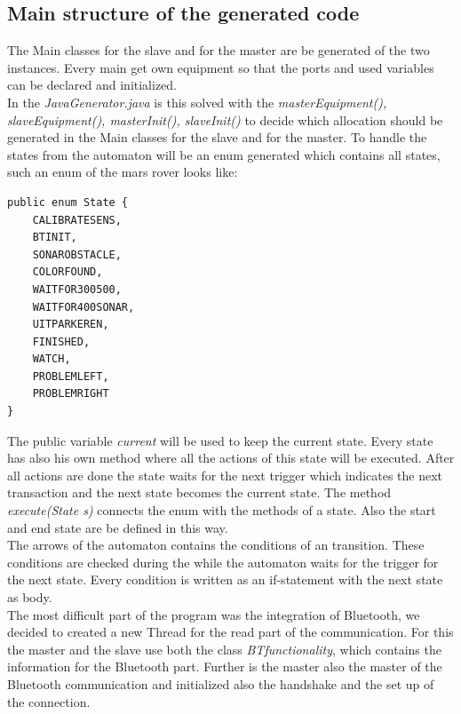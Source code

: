 \documentclass[11pt,a4paper]{article}
\begin{document}
\subsection{Main structure of the generated code}
The Main classes for the slave and for the master are be generated of the two instances. Every main get  own equipment so that the ports and used variables can be declared and initialized. \\
In the \emph{JavaGenerator.java} is this solved with the \emph{masterEquipment(), slaveEquipment(), masterInit(), slaveInit()} to decide which allocation should be generated in the Main classes for the slave and for the master. To handle the states from the automaton will be an enum generated which contains all states, such an enum of the mars rover looks like: 
\begin{verbatim}
public enum State {
    CALIBRATESENS,
    BTINIT,
    SONAROBSTACLE,
    COLORFOUND,
    WAITFOR300500,
    WAITFOR400SONAR,
    UITPARKEREN,
    FINISHED,
    WATCH,
    PROBLEMLEFT,
    PROBLEMRIGHT
}
\end{verbatim}

The public variable \emph{current} will be used to keep the current state. Every state has also his own method where all the actions of this state will be executed. After all actions are done the state waits for the next trigger which indicates the next transaction and the next state becomes the current state. 
The method \emph{execute(State s)} connects the enum with the methods of a state. Also the start and end state are be defined in this way. \\
The arrows of the automaton contains the conditions of an transition. These conditions are checked during the while the automaton waits for the trigger for the next state. Every condition is written as an if-statement with the next state as body. \\

The most difficult part of the program was the integration of Bluetooth, we decided to created a new Thread for the read part of the communication. For this the master and the slave use both the class \emph{BTfunctionality}, which contains the information for the Bluetooth part. Further is the master also the master of the Bluetooth communication and initialized also the handshake and the set up of the connection. \\
\end{document}

